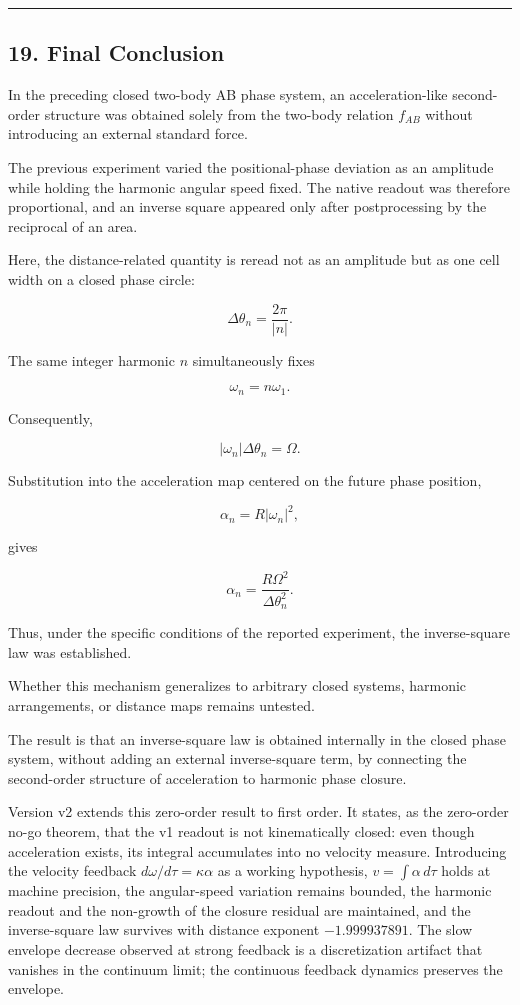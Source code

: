 \documentclass[
  a4paper,
]{article}
\begin{document}
\begin{center}\rule{0.5\linewidth}{0.5pt}\end{center}

\subsection{19. Final Conclusion}\label{final-conclusion}

In the preceding closed two-body AB phase system, an acceleration-like
second-order structure was obtained solely from the two-body relation
\(f_{AB}\) without introducing an external standard force.

The previous experiment varied the positional-phase deviation as an
amplitude while holding the harmonic angular speed fixed. The native
readout was therefore proportional, and an inverse square appeared only
after postprocessing by the reciprocal of an area.

Here, the distance-related quantity is reread not as an amplitude but as
one cell width on a closed phase circle:

\[
\Delta\theta_n=\frac{2\pi}{|n|}.
\]

The same integer harmonic \(n\) simultaneously fixes

\[
\omega_n=n\omega_1.
\]

Consequently,

\[
|\omega_n|\Delta\theta_n=\Omega.
\]

Substitution into the acceleration map centered on the future phase
position,

\[
\alpha_n=R|\omega_n|^2,
\]

gives

\[
\boxed{
\alpha_n
=\frac{R\Omega^2}{\Delta\theta_n^2}
}.
\]

Thus, under the specific conditions of the reported experiment, the
inverse-square law was established.

Whether this mechanism generalizes to arbitrary closed systems, harmonic
arrangements, or distance maps remains untested.

The result is that an inverse-square law is obtained internally in the
closed phase system, without adding an external inverse-square term, by
connecting the second-order structure of acceleration to harmonic phase
closure.

Version v2 extends this zero-order result to first order. It states, as
the zero-order no-go theorem, that the v1 readout is not kinematically
closed: even though acceleration exists, its integral accumulates into
no velocity measure. Introducing the velocity feedback
\(d\omega/d\tau=\kappa\alpha\) as a working hypothesis,
\(v=\int\alpha\,d\tau\) holds at machine precision, the angular-speed
variation remains bounded, the harmonic readout and the non-growth of
the closure residual are maintained, and the inverse-square law survives
with distance exponent \(-1.999937891\). The slow envelope decrease
observed at strong feedback is a discretization artifact that vanishes
in the continuum limit; the continuous feedback dynamics preserves the
envelope.
\end{document}

